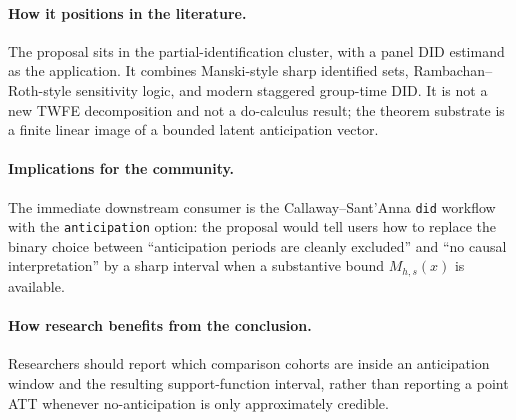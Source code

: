 \documentclass[11pt]{article}
\theoremstyle{definition}
\theoremstyle{plain}
\theoremstyle{remark}
\begin{document}
\paragraph{How it positions in the literature.}
The proposal sits in the partial-identification cluster, with a panel DID estimand as the application.  It combines Manski-style sharp identified sets, Rambachan--Roth-style sensitivity logic, and modern staggered group-time DID.  It is not a new TWFE decomposition and not a do-calculus result; the theorem substrate is a finite linear image of a bounded latent anticipation vector.

\paragraph{Implications for the community.}
The immediate downstream consumer is the Callaway--Sant'Anna \texttt{did} workflow with the \texttt{anticipation} option: the proposal would tell users how to replace the binary choice between ``anticipation periods are cleanly excluded'' and ``no causal interpretation'' by a sharp interval when a substantive bound \(M_{h,s}(x)\) is available.

\paragraph{How research benefits from the conclusion.}
Researchers should report which comparison cohorts are inside an anticipation window and the resulting support-function interval, rather than reporting a point ATT whenever no-anticipation is only approximately credible.
\end{document}
